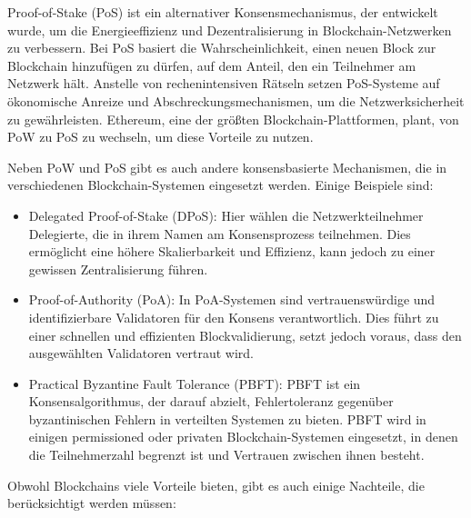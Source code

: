 Proof-of-Stake (PoS) ist ein alternativer Konsensmechanismus, der entwickelt wurde, um die Energieeffizienz und Dezentralisierung in Blockchain-Netzwerken zu verbessern. Bei PoS basiert die Wahrscheinlichkeit, einen neuen Block zur Blockchain hinzufügen zu dürfen, auf dem Anteil, den ein Teilnehmer am Netzwerk hält. Anstelle von rechenintensiven Rätseln setzen PoS-Systeme auf ökonomische Anreize und Abschreckungsmechanismen, um die Netzwerksicherheit zu gewährleisten. Ethereum, eine der größten Blockchain-Plattformen, plant, von PoW zu PoS zu wechseln, um diese Vorteile zu nutzen.

Neben PoW und PoS gibt es auch andere konsensbasierte Mechanismen, die in verschiedenen Blockchain-Systemen eingesetzt werden. Einige Beispiele sind:
\begin{itemize}
\item Delegated Proof-of-Stake (DPoS): Hier wählen die Netzwerkteilnehmer Delegierte, die in ihrem Namen am Konsensprozess teilnehmen. Dies ermöglicht eine höhere Skalierbarkeit und Effizienz, kann jedoch zu einer gewissen Zentralisierung führen.
\item Proof-of-Authority (PoA): In PoA-Systemen sind vertrauenswürdige und identifizierbare Validatoren für den Konsens verantwortlich. Dies führt zu einer schnellen und effizienten Blockvalidierung, setzt jedoch voraus, dass den ausgewählten Validatoren vertraut wird.
\item Practical Byzantine Fault Tolerance (PBFT): PBFT ist ein Konsensalgorithmus, der darauf abzielt, Fehlertoleranz gegenüber byzantinischen Fehlern in verteilten Systemen zu bieten. PBFT wird in einigen permissioned oder privaten Blockchain-Systemen eingesetzt, in denen die Teilnehmerzahl begrenzt ist und Vertrauen zwischen ihnen besteht.
\end{itemize}
Obwohl Blockchains viele Vorteile bieten, gibt es auch einige Nachteile, die berücksichtigt werden müssen:
